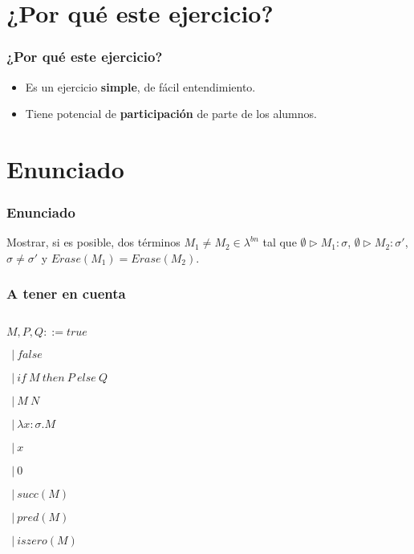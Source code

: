 \documentclass{beamer}
\begin{document}
\section{¿Por qué este ejercicio?}
\begin{frame}
\frametitle{¿Por qué este ejercicio?}
\begin{itemize}
    \item Es un ejercicio \textbf{simple},
        de fácil entendimiento.
    \item Tiene potencial de \textbf{participación}
        de parte de los alumnos.
\end{itemize}

\end{frame}

\section{Enunciado}
\begin{frame}
\frametitle{Enunciado}
Mostrar, si es posible, dos términos
$M_1 \neq M_2 \in \lambda^{bn}$ tal que
$\emptyset \triangleright M_1 : \sigma$,
$\emptyset \triangleright M_2 : \sigma'$, $\sigma \neq \sigma'$
y $Erase(M_1) = Erase(M_2)$.
\end{frame}

\begin{frame}
\frametitle{A tener en cuenta}

\begin{columns}

\begin{column}{0.5\textwidth}
$M, P, Q ::= true$

\qquad\qquad$\ \ |\ false$

\qquad\qquad$\ \ |\ if\ M\ then\ P\ else\ Q$

\qquad\qquad$\ \ |\ M\ N$

\qquad\qquad$\ \ |\ \lambda x : \sigma.M$

\qquad\qquad$\ \ |\ x$

\qquad\qquad$\ \ |\ 0$

\qquad\qquad$\ \ |\ succ(M)$

\qquad\qquad$\ \ |\ pred(M)$

\qquad\qquad$\ \ |\ iszero(M)$
\end{column}

\begin{column}{0.5\textwidth}
\end{column}

\end{columns}
\end{frame}
\end{document}
